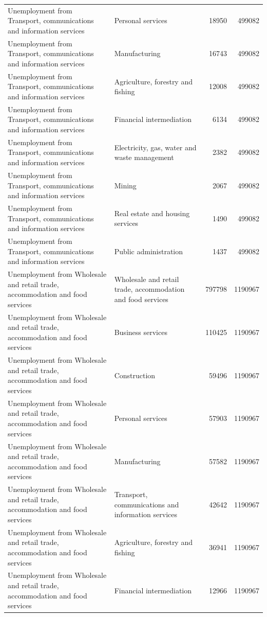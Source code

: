 \begin{longtable}{llrr}
Unemployment from Transport, communications and information services & Personal services & 18950 & 499082 \\
Unemployment from Transport, communications and information services & Manufacturing & 16743 & 499082 \\
Unemployment from Transport, communications and information services & Agriculture, forestry and fishing & 12008 & 499082 \\
Unemployment from Transport, communications and information services & Financial intermediation & 6134 & 499082 \\
Unemployment from Transport, communications and information services & Electricity, gas, water and waste management & 2382 & 499082 \\
Unemployment from Transport, communications and information services & Mining & 2067 & 499082 \\
Unemployment from Transport, communications and information services & Real estate and housing services & 1490 & 499082 \\
Unemployment from Transport, communications and information services & Public administration & 1437 & 499082 \\
Unemployment from Wholesale and retail trade, accommodation and food services & Wholesale and retail trade, accommodation and food services & 797798 & 1190967 \\
Unemployment from Wholesale and retail trade, accommodation and food services & Business services & 110425 & 1190967 \\
Unemployment from Wholesale and retail trade, accommodation and food services & Construction & 59496 & 1190967 \\
Unemployment from Wholesale and retail trade, accommodation and food services & Personal services & 57903 & 1190967 \\
Unemployment from Wholesale and retail trade, accommodation and food services & Manufacturing & 57582 & 1190967 \\
Unemployment from Wholesale and retail trade, accommodation and food services & Transport, communications and information services & 42642 & 1190967 \\
Unemployment from Wholesale and retail trade, accommodation and food services & Agriculture, forestry and fishing & 36941 & 1190967 \\
Unemployment from Wholesale and retail trade, accommodation and food services & Financial intermediation & 12966 & 1190967 \\

\end{longtable}
